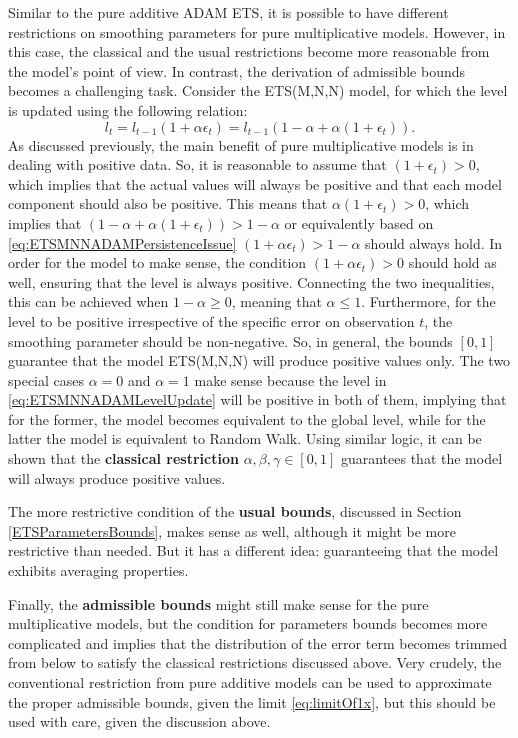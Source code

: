 \documentclass[
]{book}
\theoremstyle{definition}
\theoremstyle{definition}
\theoremstyle{definition}
\theoremstyle{definition}
\theoremstyle{remark}
\begin{document}
Similar to the pure additive ADAM ETS, it is possible to have different restrictions on smoothing parameters for pure multiplicative models. However, in this case, the classical and the usual restrictions become more reasonable from the model's point of view. In contrast, the derivation of admissible bounds becomes a challenging task. Consider the ETS(M,N,N) model, for which the level is updated using the following relation:
\begin{equation}
    l_t = l_{t-1} (1 + \alpha\epsilon_t) = l_{t-1} (1-\alpha + \alpha(1+\epsilon_t)).
  \label{eq:ETSMNNADAMLevelUpdate}
\end{equation}
As discussed previously, the main benefit of pure multiplicative models is in dealing with positive data. So, it is reasonable to assume that \((1 + \epsilon_t)>0\), which implies that the actual values will always be positive and that each model component should also be positive. This means that \(\alpha(1 + \epsilon_t)>0\), which implies that \((1-\alpha + \alpha(1+\epsilon_t))>1-\alpha\) or equivalently based on \eqref{eq:ETSMNNADAMPersistenceIssue} \((1 + \alpha\epsilon_t)>1-\alpha\) should always hold. In order for the model to make sense, the condition \((1 + \alpha\epsilon_t)>0\) should hold as well, ensuring that the level is always positive. Connecting the two inequalities, this can be achieved when \(1-\alpha \geq 0\), meaning that \(\alpha \leq 1\). Furthermore, for the level to be positive irrespective of the specific error on observation \(t\), the smoothing parameter should be non-negative. So, in general, the bounds \([0, 1]\) guarantee that the model ETS(M,N,N) will produce positive values only. The two special cases \(\alpha=0\) and \(\alpha=1\) make sense because the level in \eqref{eq:ETSMNNADAMLevelUpdate} will be positive in both of them, implying that for the former, the model becomes equivalent to the global level, while for the latter the model is equivalent to Random Walk. Using similar logic, it can be shown that the \textbf{classical restriction} \(\alpha, \beta, \gamma \in [0, 1]\) guarantees that the model will always produce positive values.

The more restrictive condition of the \textbf{usual bounds}, discussed in Section \ref{ETSParametersBounds}, makes sense as well, although it might be more restrictive than needed. But it has a different idea: guaranteeing that the model exhibits averaging properties.

Finally, the \textbf{admissible bounds} might still make sense for the pure multiplicative models, but the condition for parameters bounds becomes more complicated and implies that the distribution of the error term becomes trimmed from below to satisfy the classical restrictions discussed above. Very crudely, the conventional restriction from pure additive models can be used to approximate the proper admissible bounds, given the limit \eqref{eq:limitOf1x}, but this should be used with care, given the discussion above.
\end{document}
